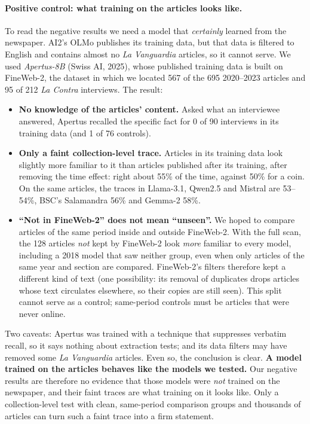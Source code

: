 \documentclass[10pt,a4paper]{article}
\begin{document}
\paragraph{Positive control: what training on the articles looks like.} To read the negative results we need a
model that \emph{certainly} learned from the newspaper. AI2's OLMo publishes its training data, but that data is
filtered to English and contains almost no \emph{La Vanguardia} articles, so it cannot serve. We used \emph{Apertus-8B} (Swiss AI,
2025), whose published training data is built on FineWeb-2, the dataset in which we located 567 of the 695 2020--2023
articles and 95 of 212 \emph{La Contra} interviews. The result:
\begin{itemize}
\item \textbf{No knowledge of the articles' content.} Asked what an interviewee answered, Apertus recalled the
specific fact for 0 of 90 interviews in its training data (and 1 of 76 controls).
\item \textbf{Only a faint collection-level trace.} Articles in its training data look slightly more familiar to it
than articles published after its training, after removing the time effect: right about 55\% of the time, against
50\% for a coin. On the same articles, the traces in Llama-3.1, Qwen2.5 and Mistral are 53--54\%, BSC's Salamandra
56\% and Gemma-2 58\%.
\item \textbf{``Not in FineWeb-2'' does not mean ``unseen''.} We hoped to compare articles of the same period inside
and outside FineWeb-2. With the full scan, the 128 articles \emph{not} kept by FineWeb-2 look \emph{more} familiar
to every model, including a 2018 model that saw neither group, even when only articles of the same year and section
are compared. FineWeb-2's filters therefore kept a different kind of text (one possibility: its removal of
duplicates drops articles whose text circulates elsewhere, so their copies are still seen). This split cannot serve
as a control; same-period controls must be articles that were never online.
\end{itemize}
Two caveats: Apertus was trained with a technique that suppresses verbatim recall, so it says nothing about extraction
tests; and its data filters may have removed some \emph{La Vanguardia} articles. Even so, the conclusion is clear. \textbf{A model
trained on the articles behaves like the models we tested.} Our negative results are therefore no evidence that
those models were \emph{not} trained on the newspaper, and their faint traces are what training on it looks like.
Only a collection-level test with clean, same-period comparison groups and thousands of articles can turn such a
faint trace into a firm statement.
\end{document}
